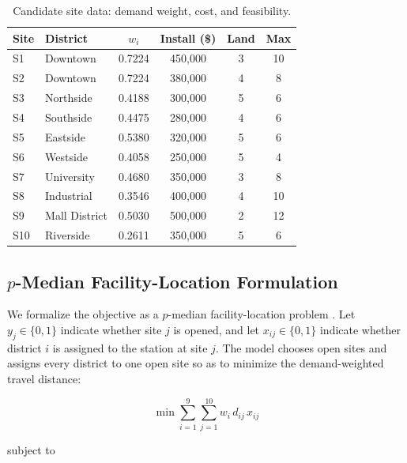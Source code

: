\documentclass[12pt]{article}
\begin{document}
\begin{table}[H]
\centering
\caption{Candidate site data: demand weight, cost, and feasibility.}
\label{tab:site-data}
\begin{tabular}{llcccc}
\toprule
Site & District & $w_i$ & Install (\$) & Land & Max \\
\midrule
S1  & Downtown     & 0.7224 & 450{,}000 & 3 & 10 \\
S2  & Downtown     & 0.7224 & 380{,}000 & 4 &  8 \\
S3  & Northside    & 0.4188 & 300{,}000 & 5 &  6 \\
S4  & Southside    & 0.4475 & 280{,}000 & 4 &  6 \\
S5  & Eastside     & 0.5380 & 320{,}000 & 5 &  6 \\
S6  & Westside     & 0.4058 & 250{,}000 & 5 &  4 \\
S7  & University   & 0.4680 & 350{,}000 & 3 &  8 \\
S8  & Industrial   & 0.3546 & 400{,}000 & 4 & 10 \\
S9  & Mall District & 0.5030 & 500{,}000 & 2 & 12 \\
S10 & Riverside    & 0.2611 & 350{,}000 & 5 &  6 \\
\bottomrule
\end{tabular}
\end{table}

\subsection{$p$-Median Facility-Location Formulation}
\label{subsec:pmedian}

We formalize the objective as a $p$-median facility-location problem \cite{daskin1995}. Let $y_j \in \{0,1\}$ indicate whether site $j$ is opened, and let $x_{ij} \in \{0,1\}$ indicate whether district $i$ is assigned to the station at site $j$. The model chooses open sites and assigns every district to one open site so as to minimize the demand-weighted travel distance:

\begin{equation}
\min \sum_{i=1}^{9} \sum_{j=1}^{10} w_i \, d_{ij} \, x_{ij}
\label{eq:pmedian-obj}
\end{equation}

subject to
\end{document}
